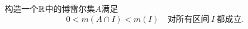 \begin{example}
    构造一个$\mathbb{R}$中的博雷尔集$A$满足
    $$ 0<m(A \cap I)<m(I) \quad \text{对所有区间}~I~\text{都成立}. $$
\end{example}
\begin{solution}


    
\end{solution}

